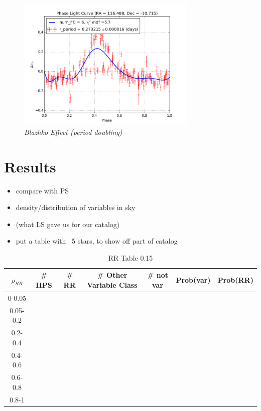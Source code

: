 \documentclass[aps,prb,twocolumn,superscriptaddress]{revtex4-1}
\begin{document}
	\begin{figure}[H]
	 \centering
	 	\includegraphics[width=3.35in]{figures/rPLCneg45E_limit2_grp_116-11_03117.png}
	 \caption{\it \small{Blazhko Effect (period doubling)}}
	 \label{fig:Blazhko}
	\end{figure}
\fi



\section{Results}
\begin{itemize}
	\item{} compare with PS~\cite{PSdata}
	\item{} density/distribution of variables in sky
	\item{} (what LS gave us for our catalog)
	\item{} put a table with ~5 stars, to show off part of catalog
\end{itemize}


\begin{table}[H]
	\begin{center}
		\begin{tabular}{ | c | c | c | c | c | c | c | }\hline
		$\rho_{RR}$ & \# HPS & \# RR & \# Other Variable Class & \# not var & Prob(var) & Prob(RR) \\ \hline
		0-0.05 &&&&&& \\ \hline
		0.05-0.2 &&&&&& \\ \hline
		0.2-0.4 &&&&&& \\ \hline
		0.4-0.6 &&&&&& \\ \hline
		0.6-0.8 &&&&&& \\ \hline
		0.8-1 &&&&&& \\ \hline
		\end{tabular}
	\end{center}
\caption{ \small{RR Table 0.15 \label{tab:rrtab}}}
\end{table}
\end{document}
